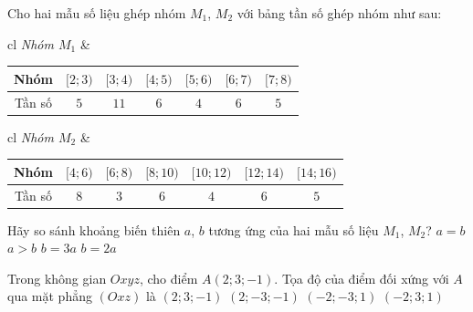 \begin{ex}%
	Cho hai mẫu số liệu ghép nhóm $M_1$, $M_2$ với bảng tần số ghép nhóm như sau:
	\begin{center}
		\begin{tabular}{cl}
			\textit{Nhóm $M_1$} &
			\begin{tabular}{|c|c|c|c|c|c|c|}
				\hline
				Nhóm & $[2;3)$ & $[3;4)$ & $[4;5)$ & $[5;6)$ & $[6;7)$ & $[7;8)$ \\
				\hline
				Tần số & $5$ & $11$ & $6$ & $4$ & $6$ & $5$ \\
				\hline
			\end{tabular}
		\end{tabular}
		
		\vspace{5pt}
		\begin{tabular}{cl}
			\textit{Nhóm $M_2$} &
			\begin{tabular}{|c|c|c|c|c|c|c|}
				\hline
				Nhóm & $[4;6)$ & $[6;8)$ & $[8;10)$ & $[10;12)$ & $[12;14)$ & $[14;16)$ \\
				\hline
				Tần số & $8$ & $3$ & $6$ & $4$ & $6$ & $5$ \\
				\hline
			\end{tabular}
		\end{tabular}
	\end{center}
	Hãy so sánh khoảng biến thiên $a$, $b$ tương ứng của hai mẫu số liệu $M_1$, $M_2$?
	\choice
	{$a=b$}
	{$a>b$}
	{$b=3a$}
	{\True $b=2a$}
\end{ex}

\begin{ex}%
	Trong không gian $Oxyz$, cho điểm $A(2;3;-1)$. Tọa độ của điểm đối xứng với $A$ qua mặt phẳng $(Oxz)$ là
	\choice
	{$(2;3;-1)$}
	{\True $(2;-3;-1)$}
	{$(-2;-3;1)$}
	{$(-2;3;1)$}
\end{ex}

